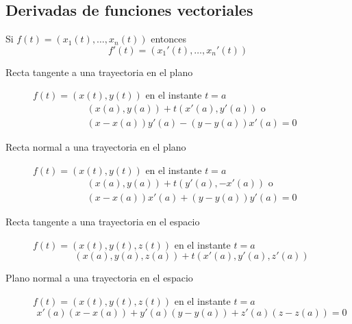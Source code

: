 \begin{multicols}{2}
\subsection*{Derivadas de funciones vectoriales}

\begin{tcolorbox}[hbox, title=Derivada de una función vectorial]
\begin{minipage}{0.4\textwidth}
\flushleft
Si $f(t)=(x_1(t),\ldots, x_n(t))$ entonces
\[
f'(t)=(x_1'(t),\ldots, x_n'(t))
\]
\end{minipage}
\end{tcolorbox}

\begin{tcolorbox}[hbox, title=Rectas tangente y normal en el plano]
\begin{minipage}{0.4\textwidth}
\flushleft
\begin{description}
\item[Recta tangente a una trayectoria en el plano] \mbox{$f(t)=(x(t),y(t))$} en el instante $t=a$
      \[
      \begin{array}{c}
      (x(a),y(a))+t(x'(a),y'(a)) \mbox{ o } \\
      (x-x(a))y'(a)-(y-y(a))x'(a)=0
      \end{array}
      \]
\item[Recta normal a una trayectoria en el plano] \mbox{$f(t)=(x(t),y(t))$} en el instante $t=a$
      \[
      \begin{array}{c}
      (x(a),y(a))+t(y'(a),-x'(a)) \mbox{ o } \\
      (x-x(a))x'(a)+(y-y(a))y'(a)=0
      \end{array}
      \]
\end{description}
\end{minipage}
\end{tcolorbox}

\begin{tcolorbox}[hbox, title=Recta tangente y plano normal en el espacio]
\begin{minipage}{0.4\textwidth}
\flushleft
\begin{description}
\item[Recta tangente a una trayectoria en el espacio] \mbox{$f(t)=(x(t),y(t),z(t))$} en el instante $t=a$
      \[
      (x(a),y(a),z(a))+t(x'(a),y'(a),z'(a))
      \]
\item[Plano normal a una trayectoria en el espacio] \mbox{$f(t)=(x(t),y(t),z(t))$} en el instante $t=a$
      \[
      x'(a)(x-x(a))+y'(a)(y-y(a))+z'(a)(z-z(a))=0
      \]
\end{description}
\end{minipage}
\end{tcolorbox}




\end{multicols}
